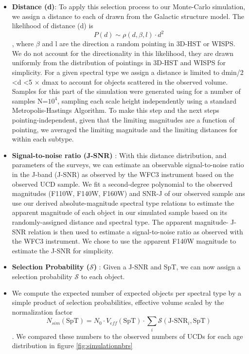 \documentclass[manuscript]{aastex63}
\begin{document}
\begin{itemize}
\item \textbf{ Distance (d)}: To apply this selection process to our Monte-Carlo simulation, we assign a distance to each of drawn from the Galactic structure model. The likelihood of distance (d) is \begin{equation}  P(d) \sim \rho (d, \beta, l) \cdot d^2 \end{equation}, where $\beta$ and l are the direction a random pointing in 3D-HST or WISPS. We do not account for the directionality in this likelihood, they are drawn uniformly from the distribution of pointings in 3D-HST and WISPS for simplicity. For a given spectral type  we assign a distance is limited to dmin/2 \textless d \textless 5 $\times$ dmax to account for objects scattered in the observed volume. Samples for this part of the simulation were generated using  for a number of samples N=$10^4$, sampling each scale height independently using a standard Metropolis-Hastings Algorithm.  To make this step and the next steps pointing-independent, given that the limiting magnitudes are a function of pointing, we averaged the limiting magnitude and the limiting distances for within each subtype.

\item \textbf{ Signal-to-noise ratio (J-SNR) }: With this distance distribution, and parameters of the surveys, we can estimate an observable signal-to-noise ratio in the J-band (J-SNR) as observed by the WFC3 instrument based on the observed UCD sample. We fit a second-degree polynomial to the observed magnitudes (F110W, F140W, F160W)  and SNR-J of our observed sample ans use our derived absolute-magnitude spectral type relations to estimate the apparent magnitude of each object in our simulated sample based on its randomly-assigned distance and spectral type. The apparent magnitude- J-SNR relation is then used to estimate a signal-to-noise ratio as observed with the WFC3 instrument. We chose to use the apparent F140W magnitude to estimate the J-SNR for simplicity.

\item \textbf{ Selection Probability ($\mathcal{S}$) }: Given a J-SNR and SpT, we can now assign a selection probability $\mathcal{S}$ to each object. 

\item We compute the expected number of expected objects per spectral type by a simple product of selection probabilities, effective volume scaled by the normalization factor
\begin{equation}
N_{sim}(\text{SpT})= N_0 \cdot V_{eff} (\text{SpT}) \cdot \sum _i \mathcal{S}(\text{J-SNR}_i, \text{SpT}) \end{equation}. We compared these numbers to the observed numbers of UCDs for each age distribution in figure \ref{fig:simulationnbrs}

\end{itemize}
\end{document}
